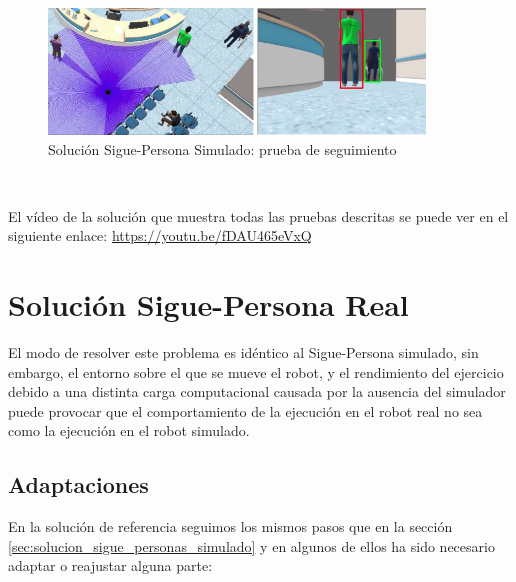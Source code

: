 \begin{itemize}
	\begin{figure} [H]
		\begin{center}
		\includegraphics[width=10cm]{imagenes/cap6/sim-solution-tracking-test.png}
		\end{center}
		\caption[Solución Sigue-Persona Simulado: prueba de seguimiento]{Solución Sigue-Persona Simulado: prueba de seguimiento}
		\label{fig:sim_solucion_tracking_test}
	\end{figure}
\end{itemize}\

El vídeo de la solución que muestra todas las pruebas descritas se puede ver en el siguiente enlace: \url{https://youtu.be/fDAU465eVxQ}\\




\section{Solución Sigue-Persona Real}
\label{sec:solucion_sigue_personas_real}

El modo de resolver este problema es idéntico al Sigue-Persona simulado, sin embargo, el entorno sobre el que se mueve el robot, y el rendimiento del ejercicio debido a una distinta carga computacional causada por la ausencia del simulador puede provocar que el comportamiento de la ejecución en el robot real no sea como la ejecución en el robot simulado.\\

\subsection{Adaptaciones}
\label{subsec:adaptaciones}

En la solución de referencia seguimos los mismos pasos que en la sección \ref{sec:solucion_sigue_personas_simulado} y en algunos de ellos ha sido necesario adaptar o reajustar alguna parte:\\

